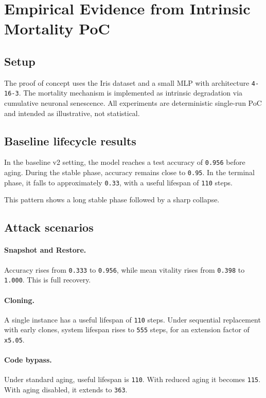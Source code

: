 \documentclass[11pt]{article}
\begin{document}
\appendix
\section{Empirical Evidence from Intrinsic Mortality PoC}

\subsection{Setup}

The proof of concept uses the Iris dataset and a small MLP with architecture \texttt{4-16-3}. The mortality mechanism is implemented as intrinsic degradation via cumulative neuronal senescence. All experiments are deterministic single-run PoC and intended as illustrative, not statistical.

\subsection{Baseline lifecycle results}

In the baseline v2 setting, the model reaches a test accuracy of \texttt{0.956} before aging. During the stable phase, accuracy remains close to \texttt{0.95}. In the terminal phase, it falls to approximately \texttt{0.33}, with a useful lifespan of \texttt{110} steps.

This pattern shows a long stable phase followed by a sharp collapse.

\subsection{Attack scenarios}

\paragraph{Snapshot and Restore.}
Accuracy rises from \texttt{0.333} to \texttt{0.956}, while mean vitality rises from \texttt{0.398} to \texttt{1.000}. This is full recovery.

\paragraph{Cloning.}
A single instance has a useful lifespan of \texttt{110} steps. Under sequential replacement with early clones, system lifespan rises to \texttt{555} steps, for an extension factor of \texttt{x5.05}.

\paragraph{Code bypass.}
Under standard aging, useful lifespan is \texttt{110}. With reduced aging it becomes \texttt{115}. With aging disabled, it extends to \texttt{363}.
\end{document}
